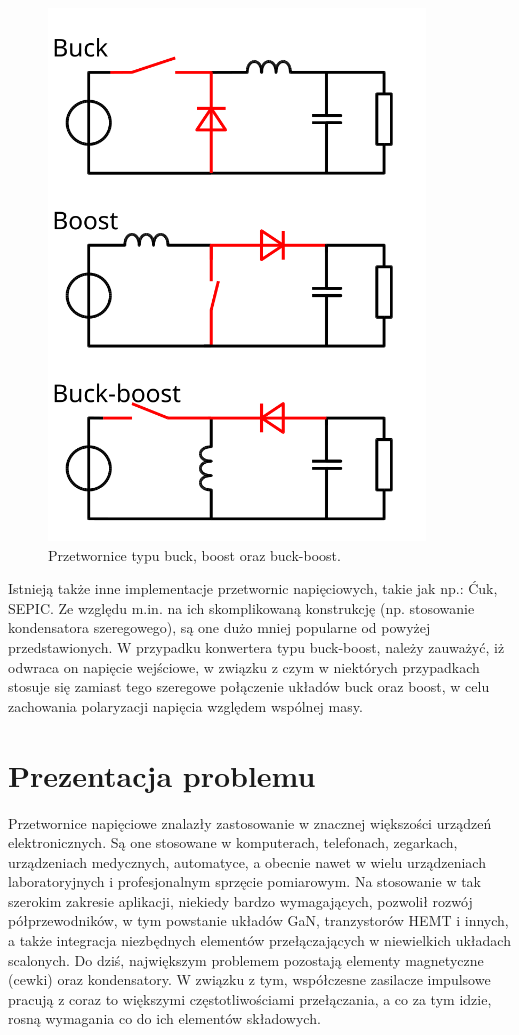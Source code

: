 \begin{figure}[h!]
    \begin{center}
        \includegraphics[width = 10cm]{images/przetworniceDC.png}
        \caption{Przetwornice typu buck, boost oraz buck-boost.}
        \label{fig:przetwornice}
    \end{center}
\end{figure}

Istnieją także inne implementacje przetwornic napięciowych, takie jak np.: Ćuk, SEPIC. Ze względu m.in. na ich skomplikowaną konstrukcję (np. stosowanie kondensatora szeregowego), są one dużo mniej popularne od powyżej przedstawionych.
W przypadku konwertera typu buck-boost, należy zauważyć, iż odwraca on napięcie wejściowe, w związku z czym w niektórych przypadkach stosuje się zamiast tego szeregowe połączenie układów buck oraz boost, w celu zachowania polaryzacji napięcia względem wspólnej masy.




\section{Prezentacja problemu}

Przetwornice napięciowe znalazły zastosowanie w znacznej większości urządzeń elektronicznych. Są one stosowane w komputerach, telefonach, zegarkach, urządzeniach medycznych, automatyce, a obecnie nawet w wielu urządzeniach laboratoryjnych i profesjonalnym sprzęcie pomiarowym.
Na stosowanie w tak szerokim zakresie aplikacji, niekiedy bardzo wymagających, pozwolił rozwój półprzewodników, w tym powstanie układów GaN, tranzystorów HEMT i innych, a także integracja niezbędnych elementów przełączających w niewielkich układach scalonych. 
Do dziś, największym problemem pozostają elementy magnetyczne (cewki) oraz kondensatory. W związku z tym, współczesne zasilacze impulsowe pracują z coraz to większymi częstotliwościami przełączania, a co za tym idzie, rosną wymagania co do ich elementów składowych.


